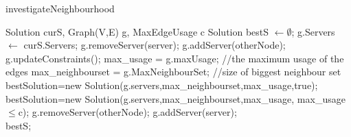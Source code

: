 \documentclass [12pt]{article}
\begin{document}
\begin {algorithm} [H]
\caption {investigateNeighbourhood}
\label {localS}
\begin {algorithmic} [3]
\Require Solution curS, Graph(V,E) g, MaxEdgeUsage c 
\State Solution bestS $\gets \emptyset$;
\State g.Servers $\gets$ curS.Servers;
\State    g.removeServer(server);
\State g.addServer(otherNode);
\State g.updateConstraints();
\State max\_usage = g.maxUsage; //the maximum usage of the edges
\State max\_neighbourset = g.MaxNeighbourSet; //size of biggest neighbour set
\State bestSolution=new Solution(g.servers,max\_neighbourset,max\_usage,true);
\EndIf 
{}
\State bestSolution=new Solution(g.servers,max\_neighbourset,max\_usage, max\_usage$\leq$c);
\EndIf
\State g.removeServer(otherNode);
\EndIf
\EndFor
\State g.addServer(server);
\EndFor\\
\Return  bestS;
\end {algorithmic}
\end {algorithm}
\end{document}
